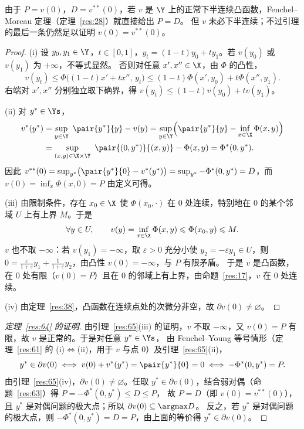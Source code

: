 由于 $P=v(0)$，$D=v^{**}(0)$，若 $v$ 是 $\Y$ 上的正常下半连续凸函数，Fenchel--Moreau 定理（定理~\ref{res:28}）就直接给出 $P=D$。
但 $v$ 未必下半连续；不过引理的最后一条仍然足以证明 $v(0)=v^{**}(0)$。

\begin{proof}
(i) 设 $y_0,y_1\in\Y$，$t\in[0,1]$，$y_t=(1-t)y_0+ty_1$。若 $v(y_0)$ 或 $v(y_1)$ 为 $+\infty$，不等式显然。
否则对任意 $x',x''\in\X$，由 $\Phi$ 的凸性，
\[
  v(y_t)\leqslant\Phi\bigl((1-t)x'+tx'',\,y_t\bigr)\leqslant(1-t)\Phi(x',y_0)+t\Phi(x'',y_1).
\]
右端对 $x',x''$ 分别独立取下确界，得 $v(y_t)\leqslant(1-t)v(y_0)+tv(y_1)$。

(ii) 对 $y^*\in\Ys$，
\[
  \begin{aligned}
  v^*(y^*)&=\sup_{y\in\Y}\ \pair{y^*}{y}-v(y)
  =\sup_{y\in\Y}\Bigl(\pair{y^*}{y}-\inf_{x\in\X}\Phi(x,y)\Bigr)\\
  &=\sup_{(x,y)\in\X\times\Y}\ \pair{(0,y^*)}{(x,y)}-\Phi(x,y)=\Phi^*(0,y^*).
  \end{aligned}
\]
因此 $v^{**}(0)=\sup_{y^*}\bigl(\pair{y^*}{0}-v^*(y^*)\bigr)=\sup_{y^*}-\Phi^*(0,y^*)=D$，而 $v(0)=\inf_x\Phi(x,0)=P$ 由定义可得。

(iii) 由限制条件，存在 $x_0\in\X$ 使 $\Phi(x_0,\cdot)$ 在 $0$ 处连续，特别地在 $0$ 的某个邻域 $U$ 上有上界 $M$。于是
\[
  \forall y\in U,\qquad v(y)=\inf_{x\in\X}\Phi(x,y)\leqslant\Phi(x_0,y)\leqslant M .
\]
$v$ 也不取 $-\infty$：若 $v(y_1)=-\infty$，取 $\varepsilon>0$ 充分小使 $y_2=-\varepsilon y_1\in U$，则
$0=\frac{\varepsilon}{1+\varepsilon}y_1+\frac1{1+\varepsilon}y_2$，由凸性 $v(0)=-\infty$，与 $P$ 有限矛盾。
于是 $v$ 是凸函数，在 $0$ 处有限（$v(0)=P$）且在 $0$ 的邻域上有上界，由命题~\ref{res:17}，$v$ 在 $0$ 处连续。

(iv) 由定理~\ref{res:38}，凸函数在连续点处的次微分非空，故 $\partial v(0)\neq\varnothing$。
\end{proof}

\begin{proof}[定理~\ref{res:64} 的证明]
由引理~\ref{res:65}(iii) 的证明，$v$ 不取 $-\infty$，又 $v(0)=P$ 有限，故 $v$ 是正常的。于是对任意 $y^*\in\Ys$，
由 Fenchel--Young 等号情形（定理~\ref{res:61} 的 (i)$\iff$(ii)，用于 $v$ 与点 $0$）及引理~\ref{res:65}(ii)，
\[
  y^*\in\partial v(0)\iff v(0)+v^*(y^*)=\pair{y^*}{0}=0\iff-\Phi^*(0,y^*)=P .
\]
由引理~\ref{res:65}(iv)，$\partial v(0)\neq\varnothing$。任取 $y^*\in\partial v(0)$，结合弱对偶（命题~\ref{res:63}）得 $P=-\Phi^*(0,y^*)\leqslant D\leqslant P$，
故 $P=D$（即 $v(0)=v^{**}(0)$），且 $y^*$ 是对偶问题的极大点；所以 $\partial v(0)\subseteq\argmax D$。
反之，若 $y^*$ 是对偶问题的极大点，则 $-\Phi^*(0,y^*)=D=P$，由上面的等价得 $y^*\in\partial v(0)$。
\end{proof}

